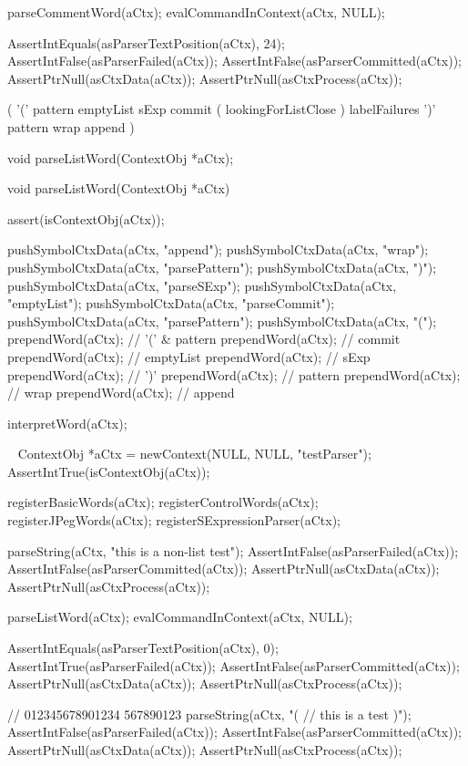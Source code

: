   parseCommentWord(aCtx);
  evalCommandInContext(aCtx, NULL);
  
  AssertIntEquals(asParserTextPosition(aCtx), 24);
  AssertIntFalse(asParserFailed(aCtx));
  AssertIntFalse(asParserCommitted(aCtx));
  AssertPtrNull(asCtxData(aCtx));
  AssertPtrNull(asCtxProcess(aCtx));
\stopCTest
\stopTestCase
\stopTestSuite

\startTestSuite[parseListWord]

\starttyping
(
  '(' pattern emptyList
  sExp commit
  ( lookingForListClose ) labelFailures
  ')' pattern wrap append
)
\stoptyping

\startCHeader
void parseListWord(ContextObj *aCtx);
\stopCHeader

\startCCode
void parseListWord(ContextObj *aCtx) {
  assert(isContextObj(aCtx));
  
  pushSymbolCtxData(aCtx, "append");
  pushSymbolCtxData(aCtx, "wrap");
  pushSymbolCtxData(aCtx, "parsePattern");
  pushSymbolCtxData(aCtx, ")");
  pushSymbolCtxData(aCtx, "parseSExp");
  pushSymbolCtxData(aCtx, "emptyList");
  pushSymbolCtxData(aCtx, "parseCommit");
  pushSymbolCtxData(aCtx, "parsePattern");
  pushSymbolCtxData(aCtx, "(");
  prependWord(aCtx); // '(' & pattern
  prependWord(aCtx); // commit
  prependWord(aCtx); // emptyList
  prependWord(aCtx); // sExp
  prependWord(aCtx); // ')'
  prependWord(aCtx); // pattern
  prependWord(aCtx); // wrap
  prependWord(aCtx); // append
  
  interpretWord(aCtx);
}
\stopCCode

\CTestsSuiteSetup\
\startCTest
  ContextObj *aCtx = newContext(NULL, NULL, "testParser");
  AssertIntTrue(isContextObj(aCtx));
  
  registerBasicWords(aCtx);
  registerControlWords(aCtx);
  registerJPegWords(aCtx);
  registerSExpressionParser(aCtx);
\stopCTest

\startCTest
  parseString(aCtx, "this is a non-list test");
  AssertIntFalse(asParserFailed(aCtx));
  AssertIntFalse(asParserCommitted(aCtx));
  AssertPtrNull(asCtxData(aCtx));
  AssertPtrNull(asCtxProcess(aCtx));
  
  parseListWord(aCtx);
  evalCommandInContext(aCtx, NULL);
  
  AssertIntEquals(asParserTextPosition(aCtx), 0);
  AssertIntTrue(asParserFailed(aCtx));
  AssertIntFalse(asParserCommitted(aCtx));
  AssertPtrNull(asCtxData(aCtx));
  AssertPtrNull(asCtxProcess(aCtx));  
\stopCTest
\stopTestCase

\startCTest
  //                012345678901234 567890123
  parseString(aCtx, "( // this is \n a test )");
  AssertIntFalse(asParserFailed(aCtx));
  AssertIntFalse(asParserCommitted(aCtx));
  AssertPtrNull(asCtxData(aCtx));
  AssertPtrNull(asCtxProcess(aCtx));
  
